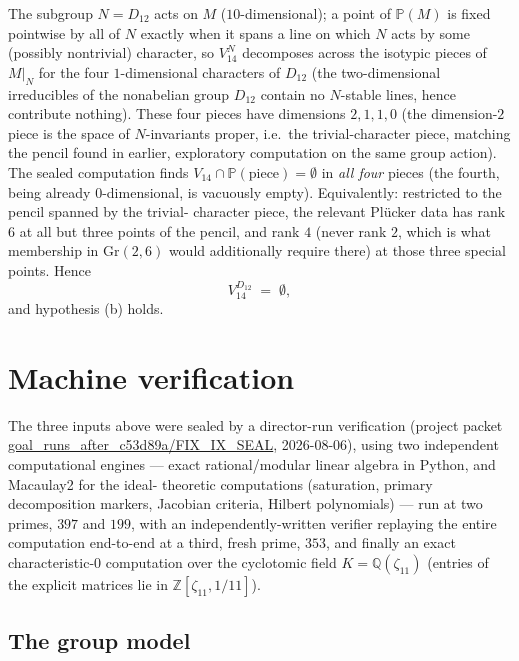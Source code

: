 \documentclass[11pt]{article}
\theoremstyle{plain}
\theoremstyle{definition}
\theoremstyle{remark}
\newcommand{\Grr}{\mathrm{Gr}}
\newcommand{\PP}{\mathbb P}
\begin{document}
The subgroup $N=D_{12}$ acts on $M$ ($10$-dimensional); a point of
$\PP(M)$ is fixed pointwise by all of $N$ exactly when it spans a line
on which $N$ acts by some (possibly nontrivial) character, so $V_{14}^N$
decomposes across the isotypic pieces of $M|_N$ for the four
$1$-dimensional characters of $D_{12}$ (the two-dimensional
irreducibles of the nonabelian group $D_{12}$ contain no $N$-stable
lines, hence contribute nothing). These four pieces have dimensions
$2,1,1,0$ (the dimension-$2$ piece is the space of $N$-invariants
proper, i.e.\ the trivial-character piece, matching the pencil found in
earlier, exploratory computation on the same group action). The sealed
computation finds $V_{14}\cap\PP(\text{piece})=\emptyset$ in \emph{all
four} pieces (the fourth, being already $0$-dimensional, is vacuously
empty). Equivalently: restricted to the pencil spanned by the trivial-
character piece, the relevant Plücker data has rank $6$ at all but
three points of the pencil, and rank $4$ (never rank $2$, which is what
membership in $\Grr(2,6)$ would additionally require there) at those
three special points. Hence
\[
V_{14}^{D_{12}} \;=\; \emptyset,
\]
and hypothesis (b) holds.

\section{Machine verification}
\label{sec:machine}

The three inputs above were sealed by a director-run verification
(project packet \url{goal_runs_after_c53d89a/FIX_IX_SEAL}, 2026-08-06),
using two independent computational engines --- exact
rational/modular linear algebra in Python, and Macaulay2 for the ideal-
theoretic computations (saturation, primary decomposition markers,
Jacobian criteria, Hilbert polynomials) --- run at two primes, $397$
and $199$, with an independently-written verifier replaying the entire
computation end-to-end at a third, fresh prime, $353$, and finally an
exact characteristic-$0$ computation over the cyclotomic field $K=
\mathbb Q(\zeta_{11})$ (entries of the explicit matrices lie in
$\mathbb Z[\zeta_{11},1/11]$).

\subsection{The group model}
\end{document}
